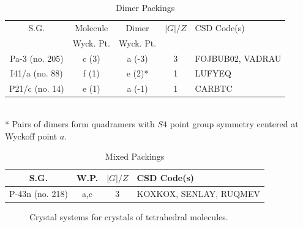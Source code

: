 \documentclass[preprint]{iucr}              %
\begin{document}
\begin{table}
\caption{Dimer Packings}
\label{tab_dimers}
\begin{tabular}{ccccl}      %
S.G. & Molecule & Dimer & $|G|/Z$& CSD Code(s) \\
& Wyck. Pt. & Wyck. Pt. \\
\hline
Pa-3 (no. 205) & c (3) & a (-3)	& 3	& FOJBUB02, VADRAU \\
I41/a (no. 88) & f (1) & e (2)*	& 1	& LUFYEQ \\
P21/c (no. 14) & e (1) & a (-1)	& 1	& CARBTC \\
\hline
\end{tabular}
\\ 
* Pairs of dimers form quadramers with $S4$ point group symmetry centered at Wyckoff point $a$.
\end{table}

\begin{table}
\caption{Mixed Packings}
\label{tab_mixed}
\begin{tabular}{cccl}      %
S.G. & W.P. & $|G|/Z$& CSD Code(s) \\
\hline
P-43n (no. 218) & a,c & 3	& KOXKOX, SENLAY, RUQMEV \\
\hline
\end{tabular}
\end{table}




\begin{figure}
\begin{center}
\caption{Crystal systems for crystals of tetrahedral
molecules.}
\end{center}
\label{distro}
\end{figure}
\end{document}
